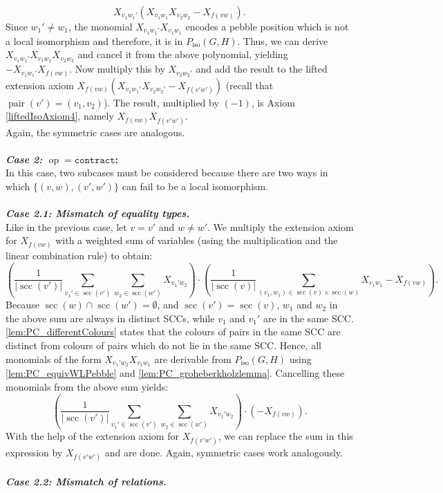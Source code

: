 \documentclass[a4paper,UKenglish,cleveref, autoref, thm-restate]{lipics-v2021}
\newcommand{\sccOp }{\texttt{contract}}
\newcommand{\op}{\operatorname{op}}
\newcommand{\scc}{{\operatorname{scc}}}
\newcommand{\pair}{{\operatorname{pair}}}
\newcommand{\Piso}{P_{\text{iso}}}
\begin{document}
\[
X_{v_1w_1'}(X_{v_1w_1}X_{v_2w_2} - X_{f(vw)}).
\]
Since $w_1' \neq w_1$, the monomial $X_{v_1w_1'}X_{v_1w_1}$ encodes a pebble position which is not a local isomorphism and therefore, it is in $\Piso(G,H)$. Thus, we can derive $X_{v_1w_1'}X_{v_1w_1}X_{v_2w_2}$ and cancel it from the above polynomial, yielding $-X_{v_1w_1'}X_{f(vw)}$. Now multiply this by $X_{v_2w_2'}$ and add the result to the lifted extension axiom $X_{f(vw)}(X_{v_1w_1'}X_{v_2w_2'} -  X_{f(v'w')})$ (recall that $\pair(v') = (v_1,v_2)$). The result, multiplied by $(-1)$, is Axiom \eqref{liftedIsoAxiom4}, namely $X_{f(vw)}X_{f(v'w')}$.\\
Again, the symmetric cases are analogous.\\
\\
\textbf{\textit{Case 2:} $\op = \sccOp $:}\\
In this case, two subcases must be considered because there are two ways in which $\{(v,w),(v',w')\}$ can fail to be a local isomorphism.\\
\\
\textbf{\textit{Case 2.1: Mismatch of equality types.}}\\
Like in the previous case, let $v = v'$ and $w \neq w'$. 
We multiply the extension axiom for $X_{f(vw)}$ with a weighted sum of variables (using the  multiplication and the linear combination rule) to obtain:
\[
\left( \frac{1}{|\scc(v')|}\sum\limits_{v_1' \in \scc(v')}\sum\limits_{w_2 \in \scc(w')} X_{v_1'w_2} \right) \cdot \left(\frac{1}{|\scc(v)|}\sum\limits_{(v_1,w_1) \in \scc(v) \times \scc(w)}  X_{v_1  w_1} - X_{f(vw)}\right).
\]
Because $\scc(w) \cap \scc(w') = \emptyset$, and $\scc(v') = \scc(v)$, $w_1$ and $w_2$ in the above sum are always in distinct SCCs, while $v_1$ and $v_1'$ are in the same SCC. \autoref{lem:PC_differentColours} states that the colours of pairs in the same SCC are distinct from colours of pairs which do not lie in the same SCC. 
Hence, all monomials of the form $X_{v_1'w_2}X_{v_1 w_1}$ are derivable from $\Piso(G,H)$ using \autoref{lem:PC_equivWLPebble} and \autoref{lem:PC_groheberkholzlemma}. Cancelling these monomials from the above sum yields:
\[
\left( \frac{1}{|\scc(v')|}\sum\limits_{v_1' \in \scc(v')} \sum\limits_{w_2 \in \scc(w')} X_{v_1'w_2} \right) \cdot \left(- X_{f(vw)}\right).
\]
With the help of the extension axiom for $X_{f(v'w')}$, we can replace the sum in this expression by $X_{f(v'w')}$ and are done. Again, symmetric cases work analogously.\\
\\
\textbf{\textit{Case 2.2: Mismatch of relations.}}
\end{document}
